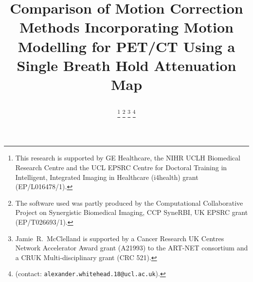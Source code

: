 \documentclass[10pt, twocolumn, twoside, letterpaper]{IEEEtran}
\begin{document}
\title{

    Comparison of Motion Correction Methods Incorporating Motion Modelling for PET/CT Using a Single Breath Hold Attenuation Map
}

\pagestyle{plain}

\author{
    
        
    
            

    \thanks{This research is supported by GE Healthcare, the NIHR UCLH Biomedical Research Centre and the UCL EPSRC Centre for Doctoral Training in Intelligent, Integrated Imaging in Healthcare (i4health) grant (EP/L016478/1).}
    \thanks{The software used was partly produced by the Computational Collaborative Project on Synergistic Biomedical Imaging, CCP SyneRBI, UK EPSRC grant (EP/T026693/1).}
    \thanks{Jamie~R.~McClelland is supported by a Cancer Research UK Centres Network Accelerator Award grant (A21993) to the ART-NET consortium and a CRUK Multi-disciplinary grant (CRC 521).}
    \thanks{(contact: \texttt{alexander.whitehead.18@ucl.ac.uk}).}
}

\maketitle
\IEEEpeerreviewmaketitle
\end{document}
